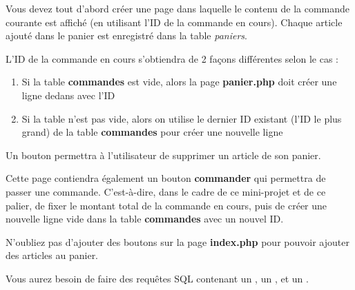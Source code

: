 

\vspace*{0.7cm}

\noindent {}

\bigskip

\noindent Vous devez tout d'abord créer une page  dans laquelle le contenu de la commande courante est affiché (en utilisant l'ID de la commande en cours).
Chaque article ajouté dans le panier est enregistré dans la table \textit{paniers}.

\medskip

\noindent L'ID de la commande en cours s'obtiendra de 2 façons différentes selon le cas :
\begin{enumerate}
\item Si la table \textbf{commandes} est vide, alors la page \textbf{panier.php} doit créer une ligne dedans avec l'ID 
\item Si la table n'est pas vide, alors on utilise le dernier ID existant (l'ID le plus grand) de la table \textbf{commandes} pour créer une nouvelle ligne
\end{enumerate}

\medskip

\noindent Un bouton permettra à l'utilisateur de supprimer un article de son panier.

\medskip

\noindent Cette page contiendra également un bouton \textbf{commander} qui permettra de passer une commande.
C'est-à-dire, dans le cadre de ce mini-projet et de ce palier, de fixer le montant total de la commande en cours, puis de créer une nouvelle ligne vide dans la table \textbf{commandes} avec un nouvel ID.

\medskip

\noindent N'oubliez pas d'ajouter des boutons sur la page \textbf{index.php} pour pouvoir ajouter des articles au panier.

\medskip

\noindent Vous aurez besoin de faire des requêtes SQL contenant un , un , et un .
